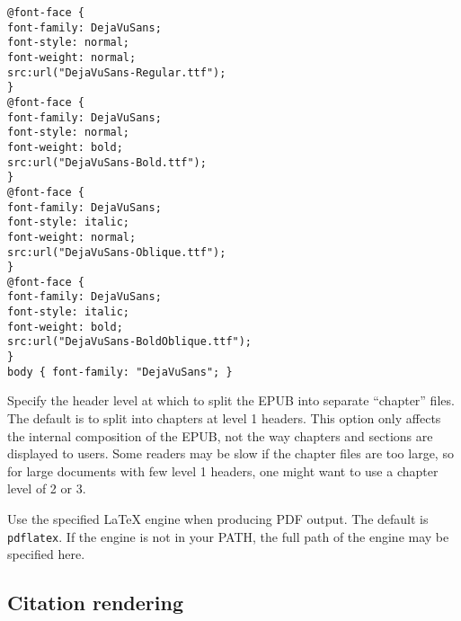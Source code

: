 \documentclass[]{article}
\begin{document}
\begin{description}
\begin{verbatim}
@font-face {
font-family: DejaVuSans;
font-style: normal;
font-weight: normal;
src:url("DejaVuSans-Regular.ttf");
}
@font-face {
font-family: DejaVuSans;
font-style: normal;
font-weight: bold;
src:url("DejaVuSans-Bold.ttf");
}
@font-face {
font-family: DejaVuSans;
font-style: italic;
font-weight: normal;
src:url("DejaVuSans-Oblique.ttf");
}
@font-face {
font-family: DejaVuSans;
font-style: italic;
font-weight: bold;
src:url("DejaVuSans-BoldOblique.ttf");
}
body { font-family: "DejaVuSans"; }
\end{verbatim}
\item[\texttt{-{}-epub-chapter-level=}\emph{NUMBER}]
Specify the header level at which to split the EPUB into separate
``chapter'' files. The default is to split into chapters at level 1
headers. This option only affects the internal composition of the EPUB,
not the way chapters and sections are displayed to users. Some readers
may be slow if the chapter files are too large, so for large documents
with few level 1 headers, one might want to use a chapter level of 2 or
3.
\item[\texttt{-{}-latex-engine=}\emph{pdflatex\textbar{}lualatex\textbar{}xelatex}]
Use the specified LaTeX engine when producing PDF output. The default is
\texttt{pdflatex}. If the engine is not in your PATH, the full path of
the engine may be specified here.
\end{description}

\subsection{Citation rendering}
\end{document}
